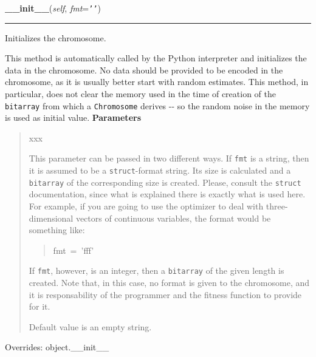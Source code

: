 \hspace{.8\funcindent}\begin{boxedminipage}{\funcwidth}

    \raggedright \textbf{\_\_init\_\_}(\textit{self}, \textit{fmt}={\tt \texttt{'}\texttt{}\texttt{'}})

    \vspace{-1.5ex}

    \rule{\textwidth}{0.5\fboxrule}
\setlength{\parskip}{2ex}

Initializes the chromosome.

This method is automatically called by the Python interpreter and
initializes the data in the chromosome. No data should be provided to be
encoded in the chromosome, as it is usually better start with random
estimates. This method, in particular, does not clear the memory used in
the time of creation of the \texttt{bitarray} from which a \texttt{Chromosome}
derives -{}- so the random noise in the memory is used as initial value.
\setlength{\parskip}{1ex}
      \textbf{Parameters}
      \vspace{-1ex}

      \begin{quote}
        \begin{Ventry}{xxx}

          \item[fmt]


This parameter can be passed in two different ways. If \texttt{fmt} is a
string, then it is assumed to be a \texttt{struct}-format string. Its
size is calculated and a \texttt{bitarray} of the corresponding size is
created. Please, consult the \texttt{struct} documentation, since what is
explained there is exactly what is used here. For example, if you
are going to use the optimizer to deal with three-dimensional
vectors of continuous variables, the format would be something
like:
%
\begin{quote}{\ttfamily \raggedright \noindent
fmt~=~'fff'
}
\end{quote}

If \texttt{fmt}, however, is an integer, then a \texttt{bitarray} of the given
length is created. Note that, in this case, no format is given to
the chromosome, and it is responsability of the programmer and the
fitness function to provide for it.

Default value is an empty string.
        \end{Ventry}

      \end{quote}

      Overrides: object.\_\_init\_\_

    \end{boxedminipage}

